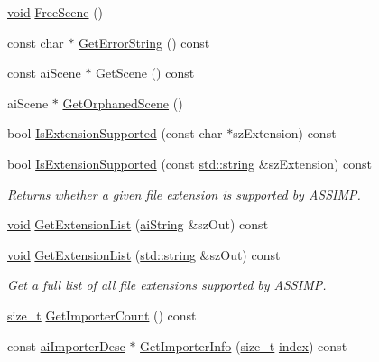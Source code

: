 \begin{DoxyCompactItemize}
\hyperlink{_s_d_l__opengl_8h_a3db05964a3cc4410f35b7ea2b7eb850d}{void} \hyperlink{class_assimp_1_1_importer_a53dafc3046abc33365a07c605716c5d4}{Free\-Scene} ()
\item 
const char $\ast$ \hyperlink{class_assimp_1_1_importer_a23bab5ba8cb9b6886c690a610766668b}{Get\-Error\-String} () const 
\item 
const ai\-Scene $\ast$ \hyperlink{class_assimp_1_1_importer_a26fd479a6a955969c1377fa59f92db66}{Get\-Scene} () const 
\item 
ai\-Scene $\ast$ \hyperlink{class_assimp_1_1_importer_a60eb9042fb85bfbd61a863e131a56ecd}{Get\-Orphaned\-Scene} ()
\item 
bool \hyperlink{class_assimp_1_1_importer_a9146ea75c33c0aac0310195346877388}{Is\-Extension\-Supported} (const char $\ast$sz\-Extension) const 
\item 
bool \hyperlink{class_assimp_1_1_importer_a5b01905366f5bf8d1f89d51f755bf7d2}{Is\-Extension\-Supported} (const \hyperlink{_s_d_l__opengl_8h_a4643b88e2349494c65861169f8944eca}{std\-::string} \&sz\-Extension) const 
\begin{DoxyCompactList}\small\item\em Returns whether a given file extension is supported by A\-S\-S\-I\-M\-P. \end{DoxyCompactList}\item 
\hyperlink{_s_d_l__opengl_8h_a3db05964a3cc4410f35b7ea2b7eb850d}{void} \hyperlink{class_assimp_1_1_importer_a23c85647f7977012d9fef20b36c2d579}{Get\-Extension\-List} (\hyperlink{structai_string}{ai\-String} \&sz\-Out) const 
\item 
\hyperlink{_s_d_l__opengl_8h_a3db05964a3cc4410f35b7ea2b7eb850d}{void} \hyperlink{class_assimp_1_1_importer_a6ab684351c55e170de3c5b7d730b306d}{Get\-Extension\-List} (\hyperlink{_s_d_l__opengl_8h_a4643b88e2349494c65861169f8944eca}{std\-::string} \&sz\-Out) const 
\begin{DoxyCompactList}\small\item\em Get a full list of all file extensions supported by A\-S\-S\-I\-M\-P. \end{DoxyCompactList}\item 
\hyperlink{_s_d_l__config_8h_a7c94ea6f8948649f8d181ae55911eeaf}{size\-\_\-t} \hyperlink{class_assimp_1_1_importer_afe982451f1a1c9b0b59c788f9329ccc1}{Get\-Importer\-Count} () const 
\item 
const \hyperlink{structai_importer_desc}{ai\-Importer\-Desc} $\ast$ \hyperlink{class_assimp_1_1_importer_a857dd22e071521c7747dc909f6a8f6f9}{Get\-Importer\-Info} (\hyperlink{_s_d_l__config_8h_a7c94ea6f8948649f8d181ae55911eeaf}{size\-\_\-t} \hyperlink{_g_l_e_w_2glew_8h_a57f14e05b1900f16a2da82ade47d0c6d}{index}) const 

\end{DoxyCompactItemize}
